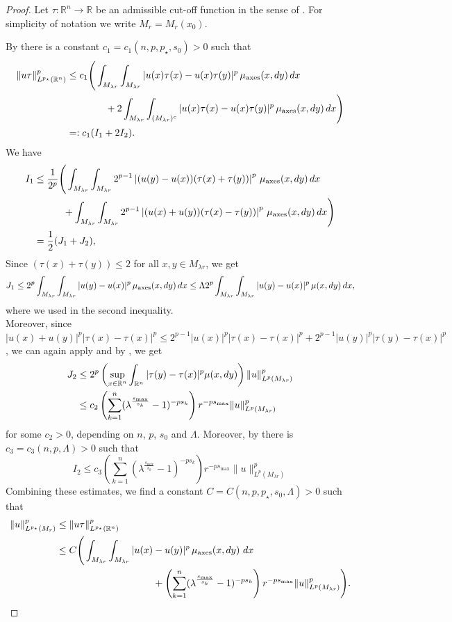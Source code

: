 \documentclass[11pt]{amsart}
\theoremstyle{plain}
\theoremstyle{definition}
\numberwithin{equation}{section}
\renewcommand{\d}{\textnormal{d}}
\newcommand{\R}{\mathbb{R}}
\newcommand{\ma}{\mu_{\mathrm{axes}}}
\begin{document}
\begin{proof}
 Let $\tau:\R^n\to\R$ be an admissible cut-off function in the sense of .
For simplicity of notation we write $M_r=M_r(x_0)$.
 
By  there is a constant $c_1=c_1(n,p,p_{\star},s_0)>0$ such that
 \begin{align*}
  \|u\tau\|_{L^{{p_{\star}}}(\R^n)}^p & \leq  c_1 \Bigg(\int_{M_{\lambda 
r}}\int_{M_{\lambda r}} |u(x)\tau(x)-u(x)\tau(y)|^p \, \ma(x,\d y)\, \d x \\
  & \qquad \qquad + 2\int_{M_{\lambda r}}\int_{(M_{\lambda r})^c} 
|u(x)\tau(x)-u(x)\tau(y)|^p \, \ma(x,\d y)\, \d x \Bigg) \\
  & =: c_1 (I_1 + 2I_2).
 \end{align*}
We have
\begin{align*}
 I_1 & \leq \frac{1}{2^{p}} \Bigg(\int_{M_{\lambda r}}\int_{M_{\lambda r}} 
2^{p-1}\left|(u(y)-u(x))(\tau(x)+\tau(y))\right|^p \, \ma(x,\d y)\, \d x\\
 & \qquad \quad + \int_{M_{\lambda r}}\int_{M_{\lambda 
r}}2^{p-1}\left|(u(x)+u(y))(\tau(x)-\tau(y))\right|^p \, \ma(x,\d y)\, \d x\Bigg) \\
 & = \frac12 (J_1+J_2),
\end{align*}
Since $(\tau(x)+\tau(y))\leq 2$ for all $x,y\in M_{\lambda r}$, we get
\[
 J_1 \leq  2^p\int_{M_{\lambda r}}\int_{M_{\lambda r}} |u(y)-u(x)|^p\, \ma(x,\d 
y)\,\d x \leq \Lambda 2^p\int_{M_{\lambda r}}\int_{M_{\lambda r}} |u(y)-u(x)|^p\, \mu(x,\d 
y)\,\d x, \]
where we used  in the second inequality.\\
Moreover, since $|u(x)+u(y)|^p|\tau(x)-\tau(x)|^p \leq 2^{p-1}|u(x)|^p|\tau(x)-\tau(x)|^p + 
2^{p-1}|u(y)|^p|\tau(y)-\tau(x)|^p$, we can again apply  and by , we get
\begin{align*} 
J_2 &\leq 2^p \left( \sup_{x\in \R^n} \int_{\R^n} |\tau(y)-\tau(x)|^p\mu(x,\d y) \right)\|u\|^p_{L^p(M_{\lambda r})}
 \\
 &\leq c_2 \left(\sum_{k=1}^n 
(\lambda^{\frac{s_{\max}}{s_k}}-1)^{-ps_k}\right)r^{-ps_{\max}}\|u\|^p_{L^p(M_{\lambda 
r})}\,
\end{align*}
for some $c_2>0$, depending on $n$, $p$, $s_0$ and $\Lambda$.
Moreover, by  there is $c_3=c_3(n,p,\Lambda)>0$ such that
\[ I_2  \leq c_3 \left(\sum_{k=1}^n 
(\lambda^{\frac{s_{\max}}{s_k}}-1)^{-ps_k}\right) r^{-ps_{\max}} \|u\|_{L^p(M_{\lambda r})}^p  \]
Combining these estimates, we find a constant $C=C(n,p,p_{\star},s_0,\Lambda)>0$ such that
\begin{align*}
  \|u\|_{L^{{p_{\star}}}(M_r)}^p &\leq \|u\tau\|_{L^{{p_{\star}}}(\R^n)}^p \\
 & \leq C \Bigg(\int_{M_{\lambda r}}\int_{M_{\lambda r}} |u(x)-u(y)|^p \, 
\ma(x,\d y)\, \, \d x\\
&\qquad \qquad \qquad \qquad \qquad   +\left(\sum_{k=1}^n 
(\lambda^{\frac{s_{\max}}{s_k}}-1)^{-ps_k}\right)r^{-ps_{\max}} \|u\|^p_{L^p(M_{\lambda r})}\Bigg). 
\end{align*}
\end{proof}
\end{document}

